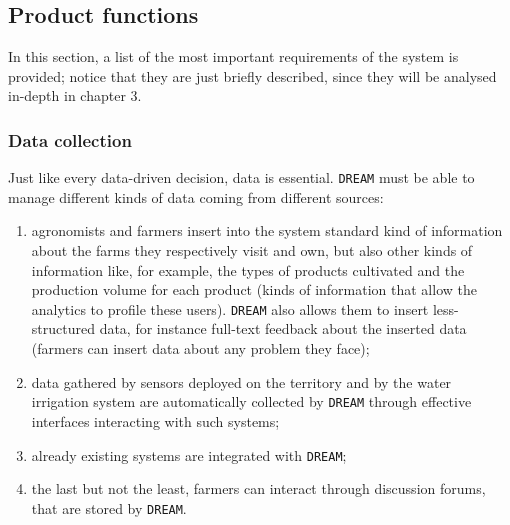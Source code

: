 \documentclass{article}
\begin{document}
\subsection{Product functions} \label{Product functions}
In this section, a list of the most important requirements of the system is provided; notice 
that they are just briefly described, since they will be analysed in-depth in chapter 3.
\subsubsection{Data collection}
Just like every data-driven decision, data is essential. \verb |DREAM| must be able to manage different kinds of data coming from different sources:
\begin{enumerate}
\item agronomists and farmers insert into the system standard kind of information about the farms they 
respectively visit and own, but also other kinds of information like, for example, the types of products 
cultivated and the production volume for each product (kinds of information that allow the analytics to 
profile these users). \verb |DREAM| also allows them to insert less-structured data, for instance full-text feedback 
about the inserted data (farmers can insert data about any problem they face);
\item data gathered by sensors deployed on the territory and by the water irrigation system are automatically 
collected by \verb|DREAM| through effective interfaces interacting with such systems;
\item already existing systems are integrated with \verb|DREAM|;
\item the last but not the least, farmers can interact through discussion forums, that are stored by \verb|DREAM|.
\end{enumerate}
\end{document}
